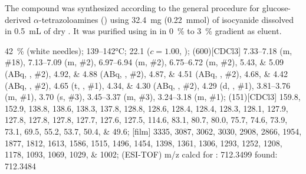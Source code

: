The compound was synthesized according to the general procedure for glucose-derived $\alpha$-tetrazoloamines () using \SI{32.4}{\milli\gram} (\SI{0.22}{\milli\mol}) of  isocyanide dissolved in \SI{0.5}{\milli\liter} of dry .
It was purified using  in  in \SI{0}{\percent} to \SI{3}{\percent} gradient as eluent.
\begin{fullexp}
	 \SI{42}{\percent} (white needles); 
	 \numrange{139}{142}\si{\celsius}; 
	\data{[$\alpha^{23}_D$]~$=$} \num{22.1} ($c = 1.00$, ); 
	\NMR(600)[CDCl3] \numrange{7.33}{7.18} (m, \#{18}), \numrange{7.13}{7.09} (m, \#{2}), \numrange{6.97}{6.94} (m, \#{2}), \numrange{6.75}{6.72} (m, \#{2}), \numlist{5.43;5.09} (ABq, , \#{2}), \numlist{4.92;4.88} (ABq, , \#{2}), \numlist{4.87;4.51} (ABq, , \#{2}), \numlist{4.68;4.42} (ABq, , \#{2}), \num{4.65} (t, , \#{1}), \numlist{4.34;4.30} (ABq, , \#{2}), \num{4.29} (d, , \#{1}), \numrange{3.81}{3.76} (m, \#{1}), \num{3.70} (s, \#{3}), \numrange{3.45}{3.37} (m, \#{3}), \numrange{3.24}{3.18} (m, \#{1}); 
	(151)[CDCl3] \numlist{159.8; 152.9; 138.8; 138.6; 138.3; 137.8; 128.8; 128.6; 128.4; 128.4; 128.3; 128.1; 127.9; 127.8; 127.8; 127.8; 127.7; 127.6; 127.5; 114.6; 83.1; 80.7; 80.0; 75.7; 74.6; 73.9; 73.1; 69.5; 55.2; 53.7; 50.4; 49.6}; 
	[film] \numlist{3335; 3087; 3062; 3030; 2908; 2866; 1954; 1877; 1812; 1613; 1586; 1515; 1496; 1454; 1398; 1361; 1306; 1293; 1252; 1208; 1178; 1093; 1069; 1029; 1002}; 
	 (ESI-TOF) m/z calcd for : \num{712.3499} found: \num{712.3484}
\end{fullexp}

